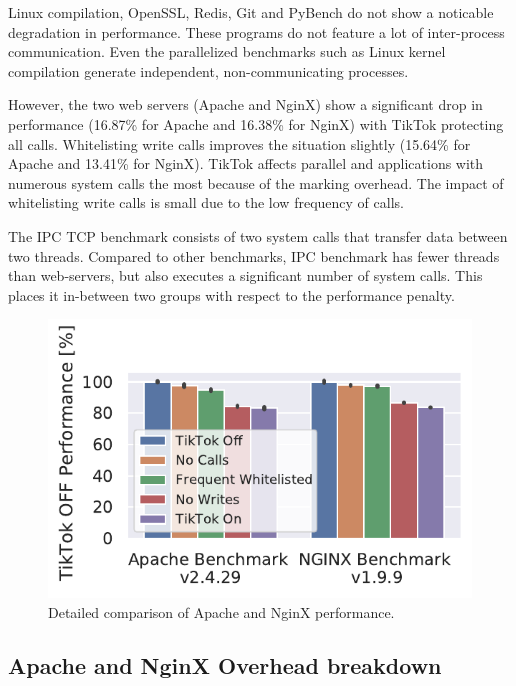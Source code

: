 \documentclass[conference]{IEEEtran}
\newcommand{\sysname}{TikTok}
\begin{document}
Linux compilation, OpenSSL, Redis, Git and PyBench do not show a noticable
degradation in performance. These programs do not feature a lot of inter-process
communication. Even the parallelized benchmarks such as Linux kernel compilation
generate independent, non-communicating processes.

However, the two web servers (Apache and NginX) show a significant drop in
performance (16.87\% for Apache and 16.38\% for NginX) with \sysname{}
protecting all calls. Whitelisting write calls improves the situation slightly
(15.64\% for Apache and 13.41\% for NginX). \sysname{} affects parallel and
applications with numerous system calls the most because of the marking
overhead. The impact of whitelisting write calls is small due to the low
frequency of calls.

The IPC TCP benchmark consists of two system calls that transfer data between
two threads. Compared to other benchmarks, IPC benchmark has fewer threads than
web-servers, but also executes a significant number of system calls. This places
it in-between two groups with respect to the performance penalty.

\begin{figure}[]
  \centering
  \includegraphics[width=\linewidth]{img/freq_removed.pdf}
  \caption{Detailed comparison of Apache and NginX performance.}
  \label{fig:phoronix-apache-nginx}
\end{figure}


\subsection{Apache and NginX Overhead breakdown}
\end{document}
